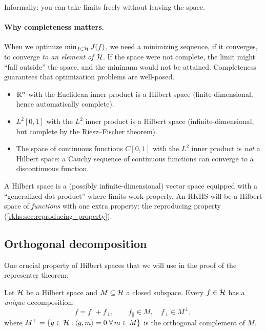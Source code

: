 \begin{notechapter}
\begin{definition}
Informally: you can take limits freely without leaving the space.
\end{definition}

\paragraph{Why completeness matters.} When we optimize $\min_{f \in \mathcal{H}}
J(f)$, we need a minimizing sequence, if it converges, to converge \emph{to an element
of $\mathcal{H}$}. If the space were not complete, the limit might ``fall
outside'' the space, and the minimum would not be attained. Completeness
guarantees that optimization problems are well-posed.

\begin{example}
\begin{itemize}
  \item $\mathbb{R}^n$ with the Euclidean inner product is a Hilbert space
  (finite-dimensional, hence automatically complete).
  \item $L^2[0,1]$ with the $L^2$ inner product is a Hilbert space
  (infinite-dimensional, but complete by the Riesz--Fischer theorem).
  \item The space of continuous functions $C[0,1]$ with the $L^2$ inner
  product is \emph{not} a Hilbert space: a Cauchy sequence of continuous
  functions can converge to a discontinuous function.
\end{itemize}
\end{example}

\begin{keyidea}
A Hilbert space is a (possibly infinite-dimensional) vector space
equipped with a ``generalized dot product'' where limits work properly.
An RKHS will be a Hilbert space of \emph{functions} with one extra
property: the reproducing property
(\cref{rkhs:sec:reproducing_property}).
\end{keyidea}

\subsection{Orthogonal decomposition}
\label{rkhs:subsec:orthogonal}

One crucial property of Hilbert spaces that we will use in the proof of
the representer theorem:

\begin{theorem}
\label{rkhs:thm:ortho_decomp}
Let $\mathcal{H}$ be a Hilbert space and $M \subseteq \mathcal{H}$ a closed
subspace. Every $f \in \mathcal{H}$ has a \emph{unique} decomposition:
\[
f = f_\parallel + f_\perp, \qquad f_\parallel \in M,\quad f_\perp \in M^\perp,
\]
where $M^\perp = \{g \in \mathcal{H} : \left\langle g, m \right\rangle = 0 \;\forall\, m \in M\}$
is the orthogonal complement of $M$.


\end{theorem}
\end{notechapter}
